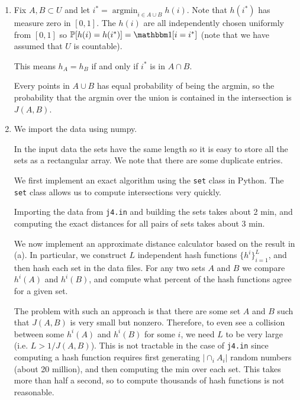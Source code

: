 \documentclass[10pt]{article}
\begin{document}
\begin{solution}[Solution]
\begin{enumerate}[label=(\alph*)]
    \item Fix \( A,B \subset U \) and let \( i^* =   \operatorname{argmin}_{i\in A\cup B} h(i) \). Note that \( h(i^*) \) has measure zero in \( [0,1] \).
        The \( h(i) \) are all independently chosen uniformly from \( [0,1] \) so \(\PP[ h(i) = h(i^*) ] = \bOne[i=i^*] \) (note that we have assumed that \( U \) is countable).
        
        This means \( h_A = h_B \) if and only if \( i^* \) is in \( A\cap B \).
        
        Every points in \( A\cup B \) has equal probability of being the argmin, so the probability that the argmin over the union is contained in the intersection is \( J(A,B) \).

    \item

    We import the data using numpy.
        
    In the input data the sets have the same length so it is easy to store all the sets as a rectangular array. We note that there are some duplicate entries.
    
    We first implement an exact algorithm using the {\tt set} class in Python. The {\tt set} class allows us to compute intersections very quickly. 

        

    Importing the data from {\tt j4.in} and building the sets takes about 2 min, and computing the exact distances for all pairs of sets takes about 3 min.

        We now implement an approximate distance calculator based on the result in (a). In particular, we construct \( L \) independent hash functions \( \{h^i\}_{i=1}^{L} \), and then hash each set in the data files. For any two sets \( A \) and \( B \) we compare \( h^i(A) \) and \( h^i(B) \), and compute what percent of the hash functions agree for a given set.

        

        The problem with such an approach is that there are some set \( A \) and \( B \) such that \( J(A,B) \) is very small but nonzero. Therefore, to even see a collision between some \( h^i(A) \) and \( h^i(B) \) for some \( i \), we need \( L \) to be very large (i.e. \( L > 1/ J(A,B) \)). This is not tractable in the case of {\tt j4.in} since computing a hash function requires first generating \( |\cap_i A_i| \) random numbers (about 20 million), and then computing the min over each set. This takes more than half a second, so to compute thousands of hash functions is not reasonable.


\end{enumerate}
\end{solution}
\end{document}
